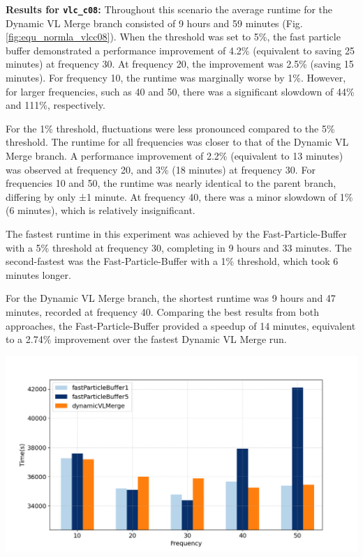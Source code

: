 \textbf{Results for \texttt{vlc\_c08}:}  
Throughout this scenario the average runtime for the Dynamic VL Merge branch consisted of 9 hours and 59 minutes (Fig.\ref{fig:equ_normla_vlcc08}). When the threshold was set to 5\%, the fast particle buffer demonstrated a performance improvement of 4.2\% (equivalent to saving 25 minutes) at frequency 30. At frequency 20, the improvement was 2.5\% (saving 15 minutes). For frequency 10, the runtime was marginally worse by 1\%. However, for larger frequencies, such as 40 and 50, there was a significant slowdown of 44\% and 111\%, respectively.

For the 1\% threshold, fluctuations were less pronounced compared to the 5\% threshold. The runtime for all frequencies was closer to that of the Dynamic VL Merge branch. A performance improvement of 2.2\% (equivalent to 13 minutes) was observed at frequency 20, and 3\% (18 minutes) at frequency 30. For frequencies 10 and 50, the runtime was nearly identical to the parent branch, differing by only ±1 minute. At frequency 40, there was a minor slowdown of 1\% (6 minutes), which is relatively insignificant.

The fastest runtime in this experiment was achieved by the Fast-Particle-Buffer with a 5\% threshold at frequency 30, completing in 9 hours and 33 minutes. The second-fastest was the Fast-Particle-Buffer with a 1\% threshold, which took 6 minutes longer.

For the Dynamic VL Merge branch, the shortest runtime was 9 hours and 47 minutes, recorded at frequency 40. Comparing the best results from both approaches, the Fast-Particle-Buffer provided a speedup of 14 minutes, equivalent to a 2.74\% improvement over the fastest Dynamic VL Merge run.

\begin{center}
    \includegraphics[width=0.8\linewidth]{graphs/spinodalDecomposition/vlcc08.png}
    \captionsetup{hypcap=false}
    \label{fig:equ_normla_vlcc08}
\end{center}



